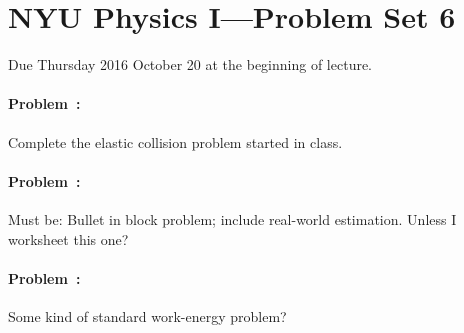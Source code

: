 \documentclass[12pt]{article}
\begin{document}
\section*{NYU Physics I---Problem Set 6}

Due Thursday 2016 October 20 at the beginning of lecture.

\paragraph{Problem~\theproblem:}%
Complete the elastic collision problem started in class.

\paragraph{Problem~\theproblem:}%
Must be: Bullet in block problem; include real-world estimation. Unless I worksheet this one?

\paragraph{Problem~\theproblem:}%
Some kind of standard work-energy problem?
\end{document}
